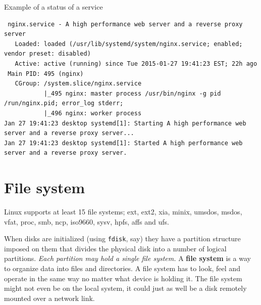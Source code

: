 Example of a status of a service
{\tiny
\begin{verbatim}
 nginx.service - A high performance web server and a reverse proxy server
   Loaded: loaded (/usr/lib/systemd/system/nginx.service; enabled; vendor preset: disabled)
   Active: active (running) since Tue 2015-01-27 19:41:23 EST; 22h ago
 Main PID: 495 (nginx)
   CGroup: /system.slice/nginx.service
           |_495 nginx: master process /usr/bin/nginx -g pid /run/nginx.pid; error_log stderr;
           |_496 nginx: worker process
Jan 27 19:41:23 desktop systemd[1]: Starting A high performance web server and a reverse proxy server...
Jan 27 19:41:23 desktop systemd[1]: Started A high performance web server and a reverse proxy server.
\end{verbatim}
}





\section{File system}
\label{sec:file-system}

Linux supports at least 15 file systems; ext, ext2, xia, minix, umsdos, msdos,
vfat, proc, smb, ncp, iso9660, sysv, hpfs, affs and ufs.

When disks are initialized (using \verb!fdisk!, say) they have a partition
structure imposed on them that divides the physical disk into a number of
logical partitions. {\it Each partition may hold a single file system.}
A {\bf file system} is a way to organize data into files and directories.
A file system has to look, feel and operate in the same way no matter what
device is holding it. The file system might not even be on the local system, it
could just as well be a disk remotely mounted over a network link.


